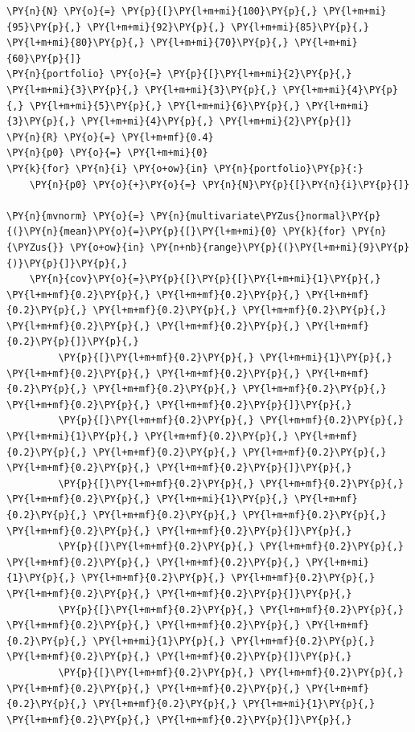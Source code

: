 \begin{tcolorbox}[breakable, size=fbox, boxrule=1pt, pad at break*=1mm,colback=cellbackground, colframe=cellborder]
\begin{Verbatim}[commandchars=\\\{\}]
\PY{n}{N} \PY{o}{=} \PY{p}{[}\PY{l+m+mi}{100}\PY{p}{,} \PY{l+m+mi}{95}\PY{p}{,} \PY{l+m+mi}{92}\PY{p}{,} \PY{l+m+mi}{85}\PY{p}{,} \PY{l+m+mi}{80}\PY{p}{,} \PY{l+m+mi}{70}\PY{p}{,} \PY{l+m+mi}{60}\PY{p}{]}
\PY{n}{portfolio} \PY{o}{=} \PY{p}{[}\PY{l+m+mi}{2}\PY{p}{,} \PY{l+m+mi}{3}\PY{p}{,} \PY{l+m+mi}{3}\PY{p}{,} \PY{l+m+mi}{4}\PY{p}{,} \PY{l+m+mi}{5}\PY{p}{,} \PY{l+m+mi}{6}\PY{p}{,} \PY{l+m+mi}{3}\PY{p}{,} \PY{l+m+mi}{4}\PY{p}{,} \PY{l+m+mi}{2}\PY{p}{]}
\PY{n}{R} \PY{o}{=} \PY{l+m+mf}{0.4}
\PY{n}{p0} \PY{o}{=} \PY{l+m+mi}{0}
\PY{k}{for} \PY{n}{i} \PY{o+ow}{in} \PY{n}{portfolio}\PY{p}{:}
    \PY{n}{p0} \PY{o}{+}\PY{o}{=} \PY{n}{N}\PY{p}{[}\PY{n}{i}\PY{p}{]}
		
\PY{n}{mvnorm} \PY{o}{=} \PY{n}{multivariate\PYZus{}normal}\PY{p}{(}\PY{n}{mean}\PY{o}{=}\PY{p}{[}\PY{l+m+mi}{0} \PY{k}{for} \PY{n}{\PYZus{}} \PY{o+ow}{in} \PY{n+nb}{range}\PY{p}{(}\PY{l+m+mi}{9}\PY{p}{)}\PY{p}{]}\PY{p}{,} 
    \PY{n}{cov}\PY{o}{=}\PY{p}{[}\PY{p}{[}\PY{l+m+mi}{1}\PY{p}{,} \PY{l+m+mf}{0.2}\PY{p}{,} \PY{l+m+mf}{0.2}\PY{p}{,} \PY{l+m+mf}{0.2}\PY{p}{,} \PY{l+m+mf}{0.2}\PY{p}{,} \PY{l+m+mf}{0.2}\PY{p}{,} \PY{l+m+mf}{0.2}\PY{p}{,} \PY{l+m+mf}{0.2}\PY{p}{,} \PY{l+m+mf}{0.2}\PY{p}{]}\PY{p}{,}
         \PY{p}{[}\PY{l+m+mf}{0.2}\PY{p}{,} \PY{l+m+mi}{1}\PY{p}{,} \PY{l+m+mf}{0.2}\PY{p}{,} \PY{l+m+mf}{0.2}\PY{p}{,} \PY{l+m+mf}{0.2}\PY{p}{,} \PY{l+m+mf}{0.2}\PY{p}{,} \PY{l+m+mf}{0.2}\PY{p}{,} \PY{l+m+mf}{0.2}\PY{p}{,} \PY{l+m+mf}{0.2}\PY{p}{]}\PY{p}{,}
         \PY{p}{[}\PY{l+m+mf}{0.2}\PY{p}{,} \PY{l+m+mf}{0.2}\PY{p}{,} \PY{l+m+mi}{1}\PY{p}{,} \PY{l+m+mf}{0.2}\PY{p}{,} \PY{l+m+mf}{0.2}\PY{p}{,} \PY{l+m+mf}{0.2}\PY{p}{,} \PY{l+m+mf}{0.2}\PY{p}{,} \PY{l+m+mf}{0.2}\PY{p}{,} \PY{l+m+mf}{0.2}\PY{p}{]}\PY{p}{,}
         \PY{p}{[}\PY{l+m+mf}{0.2}\PY{p}{,} \PY{l+m+mf}{0.2}\PY{p}{,} \PY{l+m+mf}{0.2}\PY{p}{,} \PY{l+m+mi}{1}\PY{p}{,} \PY{l+m+mf}{0.2}\PY{p}{,} \PY{l+m+mf}{0.2}\PY{p}{,} \PY{l+m+mf}{0.2}\PY{p}{,} \PY{l+m+mf}{0.2}\PY{p}{,} \PY{l+m+mf}{0.2}\PY{p}{]}\PY{p}{,}
         \PY{p}{[}\PY{l+m+mf}{0.2}\PY{p}{,} \PY{l+m+mf}{0.2}\PY{p}{,} \PY{l+m+mf}{0.2}\PY{p}{,} \PY{l+m+mf}{0.2}\PY{p}{,} \PY{l+m+mi}{1}\PY{p}{,} \PY{l+m+mf}{0.2}\PY{p}{,} \PY{l+m+mf}{0.2}\PY{p}{,} \PY{l+m+mf}{0.2}\PY{p}{,} \PY{l+m+mf}{0.2}\PY{p}{]}\PY{p}{,}
         \PY{p}{[}\PY{l+m+mf}{0.2}\PY{p}{,} \PY{l+m+mf}{0.2}\PY{p}{,} \PY{l+m+mf}{0.2}\PY{p}{,} \PY{l+m+mf}{0.2}\PY{p}{,} \PY{l+m+mf}{0.2}\PY{p}{,} \PY{l+m+mi}{1}\PY{p}{,} \PY{l+m+mf}{0.2}\PY{p}{,} \PY{l+m+mf}{0.2}\PY{p}{,} \PY{l+m+mf}{0.2}\PY{p}{]}\PY{p}{,}
         \PY{p}{[}\PY{l+m+mf}{0.2}\PY{p}{,} \PY{l+m+mf}{0.2}\PY{p}{,} \PY{l+m+mf}{0.2}\PY{p}{,} \PY{l+m+mf}{0.2}\PY{p}{,} \PY{l+m+mf}{0.2}\PY{p}{,} \PY{l+m+mf}{0.2}\PY{p}{,} \PY{l+m+mi}{1}\PY{p}{,} \PY{l+m+mf}{0.2}\PY{p}{,} \PY{l+m+mf}{0.2}\PY{p}{]}\PY{p}{,}

\end{Verbatim}
\end{tcolorbox}
